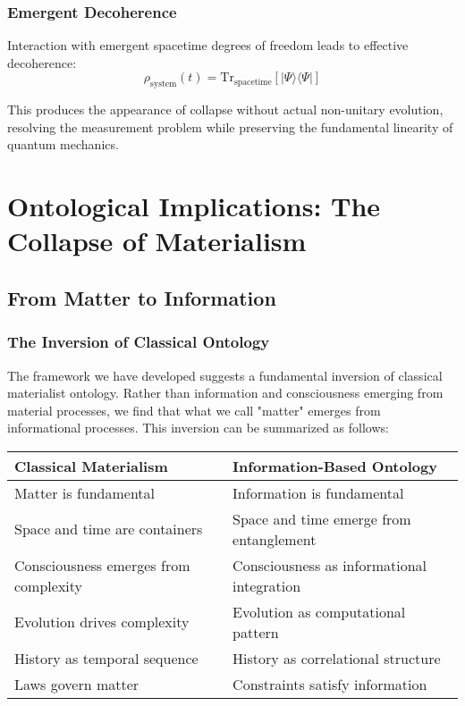 \documentclass[12pt,a4paper]{article}
\newcommand{\ket}[1]{|#1\rangle}
\newcommand{\bra}[1]{\langle#1|}
\newcommand{\trace}{\text{Tr}}
\begin{document}
\subsubsection{Emergent Decoherence}

Interaction with emergent spacetime degrees of freedom leads to effective decoherence:
\begin{equation}
    \rho_{\text{system}}(t) = \trace_{\text{spacetime}}[\ket{\Psi}\bra{\Psi}]
\end{equation}

This produces the appearance of collapse without actual non-unitary evolution, resolving the measurement problem while preserving the fundamental linearity of quantum mechanics.

\section{Ontological Implications: The Collapse of Materialism}

\subsection{From Matter to Information}

\subsubsection{The Inversion of Classical Ontology}

The framework we have developed suggests a fundamental inversion of classical materialist ontology. Rather than information and consciousness emerging from material processes, we find that what we call "matter" emerges from informational processes. This inversion can be summarized as follows:

\begin{center}
\begin{tabular}{|l|l|}
\hline
\textbf{Classical Materialism} & \textbf{Information-Based Ontology} \\
\hline
Matter is fundamental & Information is fundamental \\
Space and time are containers & Space and time emerge from entanglement \\
Consciousness emerges from complexity & Consciousness as informational integration \\
Evolution drives complexity & Evolution as computational pattern \\
History as temporal sequence & History as correlational structure \\
Laws govern matter & Constraints satisfy information \\
\hline
\end{tabular}
\end{center}
\end{document}
